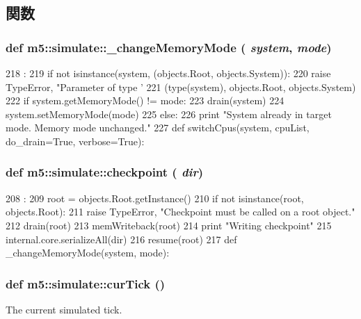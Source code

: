 \subsection{関数}
\hypertarget{namespacem5_1_1simulate_aa1c89476d25ce43527d97c047f909a12}{
\subsubsection[{\_\-changeMemoryMode}]{\setlength{\rightskip}{0pt plus 5cm}def m5::simulate::\_\-changeMemoryMode ( {\em system}, \/   {\em mode})}}
\label{namespacem5_1_1simulate_aa1c89476d25ce43527d97c047f909a12}



\begin{DoxyCode}
218                                    :
219     if not isinstance(system, (objects.Root, objects.System)):
220         raise TypeError, "Parameter of type '%
221               (type(system), objects.Root, objects.System)
222     if system.getMemoryMode() != mode:
223         drain(system)
224         system.setMemoryMode(mode)
225     else:
226         print "System already in target mode. Memory mode unchanged."
227 
def switchCpus(system, cpuList, do_drain=True, verbose=True):
\end{DoxyCode}
\hypertarget{namespacem5_1_1simulate_a5fae4e20027ec1eaf6fdb333b9e4b2bf}{
\subsubsection[{checkpoint}]{\setlength{\rightskip}{0pt plus 5cm}def m5::simulate::checkpoint ( {\em dir})}}
\label{namespacem5_1_1simulate_a5fae4e20027ec1eaf6fdb333b9e4b2bf}



\begin{DoxyCode}
208                    :
209     root = objects.Root.getInstance()
210     if not isinstance(root, objects.Root):
211         raise TypeError, "Checkpoint must be called on a root object."
212     drain(root)
213     memWriteback(root)
214     print "Writing checkpoint"
215     internal.core.serializeAll(dir)
216     resume(root)
217 
def _changeMemoryMode(system, mode):
\end{DoxyCode}
\hypertarget{namespacem5_1_1simulate_a31b3d3628897d38d2c530832ef4907cf}{
\subsubsection[{curTick}]{\setlength{\rightskip}{0pt plus 5cm}def m5::simulate::curTick ()}}
\label{namespacem5_1_1simulate_a31b3d3628897d38d2c530832ef4907cf}
The current simulated tick. 


